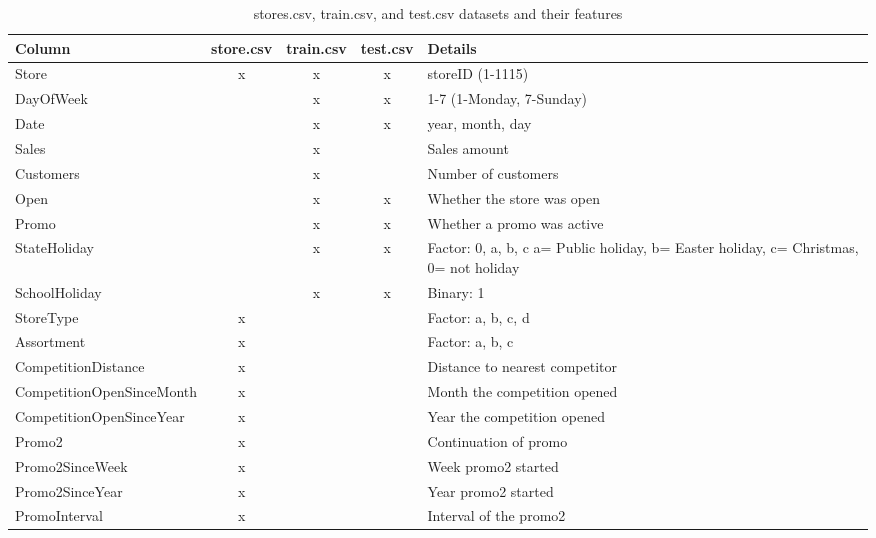 \documentclass[12pt]{report}
\begin{document}


\begin{table}[h]
    \centering
    \begin{tabular}{|l|c|c|c|p{4cm}|}
        \hline
        \textbf{Column} & \textbf{store.csv} & \textbf{train.csv} & \textbf{test.csv} & \textbf{Details} \\
        \hline
        Store & x & x & x & storeID (1-1115) \\
        \hline
        DayOfWeek &  & x & x & 1-7 (1-Monday, 7-Sunday) \\
        \hline
        Date &  & x & x & year, month, day \\
        \hline
        Sales &  & x &  & Sales amount \\
        \hline
        Customers &  & x &  & Number of customers \\
        \hline
        Open &  & x & x & Whether the store was open \\
        \hline
        Promo &  & x & x & Whether a promo was active \\
        \hline
        StateHoliday &  & x & x & Factor: 0, a, b, c \newline a= Public holiday, b= Easter holiday, c= Christmas, 0= not holiday \\
        \hline
        SchoolHoliday &  & x & x & Binary: 1 \\
        \hline
        StoreType & x &  &  & Factor: a, b, c, d \\
        \hline
        Assortment & x &  &  & Factor: a, b, c \\
        \hline
        CompetitionDistance & x &  &  & Distance to nearest competitor \\
        \hline
        CompetitionOpenSinceMonth & x &  &  & Month the competition opened \\
        \hline
        CompetitionOpenSinceYear & x &  &  & Year the competition opened \\
        \hline
        Promo2 & x &  &  & Continuation of promo \\
        \hline
        Promo2SinceWeek & x &  &  & Week promo2 started \\
        \hline
        Promo2SinceYear & x &  &  & Year promo2 started \\
        \hline
        PromoInterval & x &  &  & Interval of the promo2 \\
        \hline
    \end{tabular}
    \caption{stores.csv, train.csv, and test.csv datasets and their features}
\end{table}
\end{document}
